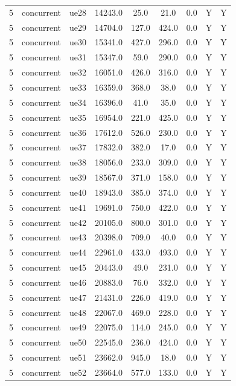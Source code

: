 \begin{table}[ht]
\begin{tabular}{|c|c|c|c|c|c|c|c|c|}
5 & concurrent & ue28 & 14243.0 & 25.0 & 21.0 & 0.0 & Y & Y \\
5 & concurrent & ue29 & 14704.0 & 127.0 & 424.0 & 0.0 & Y & Y \\
5 & concurrent & ue30 & 15341.0 & 427.0 & 296.0 & 0.0 & Y & Y \\
5 & concurrent & ue31 & 15347.0 & 59.0 & 290.0 & 0.0 & Y & Y \\
5 & concurrent & ue32 & 16051.0 & 426.0 & 316.0 & 0.0 & Y & Y \\
5 & concurrent & ue33 & 16359.0 & 368.0 & 38.0 & 0.0 & Y & Y \\
5 & concurrent & ue34 & 16396.0 & 41.0 & 35.0 & 0.0 & Y & Y \\
5 & concurrent & ue35 & 16954.0 & 221.0 & 425.0 & 0.0 & Y & Y \\
5 & concurrent & ue36 & 17612.0 & 526.0 & 230.0 & 0.0 & Y & Y \\
5 & concurrent & ue37 & 17832.0 & 382.0 & 17.0 & 0.0 & Y & Y \\
5 & concurrent & ue38 & 18056.0 & 233.0 & 309.0 & 0.0 & Y & Y \\
5 & concurrent & ue39 & 18567.0 & 371.0 & 158.0 & 0.0 & Y & Y \\
5 & concurrent & ue40 & 18943.0 & 385.0 & 374.0 & 0.0 & Y & Y \\
5 & concurrent & ue41 & 19691.0 & 750.0 & 422.0 & 0.0 & Y & Y \\
5 & concurrent & ue42 & 20105.0 & 800.0 & 301.0 & 0.0 & Y & Y \\
5 & concurrent & ue43 & 20398.0 & 709.0 & 40.0 & 0.0 & Y & Y \\
5 & concurrent & ue44 & 22961.0 & 433.0 & 493.0 & 0.0 & Y & Y \\
5 & concurrent & ue45 & 20443.0 & 49.0 & 231.0 & 0.0 & Y & Y \\
5 & concurrent & ue46 & 20883.0 & 76.0 & 332.0 & 0.0 & Y & Y \\
5 & concurrent & ue47 & 21431.0 & 226.0 & 419.0 & 0.0 & Y & Y \\
5 & concurrent & ue48 & 22067.0 & 469.0 & 228.0 & 0.0 & Y & Y \\
5 & concurrent & ue49 & 22075.0 & 114.0 & 245.0 & 0.0 & Y & Y \\
5 & concurrent & ue50 & 22545.0 & 236.0 & 424.0 & 0.0 & Y & Y \\
5 & concurrent & ue51 & 23662.0 & 945.0 & 18.0 & 0.0 & Y & Y \\
5 & concurrent & ue52 & 23664.0 & 577.0 & 133.0 & 0.0 & Y & Y \\

\end{tabular}
\end{table}
